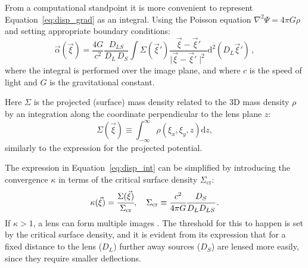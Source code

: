 From a computational standpoint it is more convenient to represent Equation~\eqref{eq:disp_grad} as an integral. Using the Poisson equation $\nabla^2 \Psi= 4\pi G\rho$ and setting appropriate boundary conditions:
\begin{equation} \label{eq:disp_int}
    \vec{\alpha}(\vec{\xi}) = \frac{4 G}{c^2} \frac{D_{LS}}{D_L \, D_S} \int \Sigma(\vec{\xi}') \frac{\vec{\xi} - \vec{\xi}'}{\mid\vec{\xi} - \vec{\xi}'\mid^2}   \mathrm{d}^2{(D_L \vec{\xi}')} \, ,
\end{equation}
where the integral is performed over the image plane, and where $c$ is the speed of light and $G$ is the gravitational constant.

Here $\Sigma$ is the projected (surface) mass density related to the 3D mass density $\rho$ by an integration along the coordinate perpendicular to the lens plane $z$:
\begin{equation}
	\Sigma(\vec\xi) \equiv \int_{-\infty}^{\infty} \rho({\xi}_x, {\xi}_y, z) \mathrm{d}{z},
\end{equation}
similarly to the expression for the projected potential.

The expression in Equation~\eqref{eq:disp_int} can be simplified by introducing the convergence $\kappa$ in terms of the critical surface density $\Sigma_{\mathrm{cr}}$:
\begin{equation}
    \kappa(\vec{\xi})=\cfrac{\Sigma(\vec{\xi})}{\Sigma_{\mathrm{cr}}},
    \quad \Sigma_{\mathrm{cr}}\equiv\cfrac{c^2}{4\pi G}\cfrac{D_S}{D_L D_{LS}} \, .
\end{equation}
If  $\kappa > 1$, a lens can form multiple images \cite[Section 2.6]{Meneghetti:2016aa}. The threshold for this to happen is set by the critical surface density, and it is evident from its expression that for a fixed distance to the lens ($D_L $) further away sources  ($D_S$) are lensed more easily, since they require smaller deflections.

